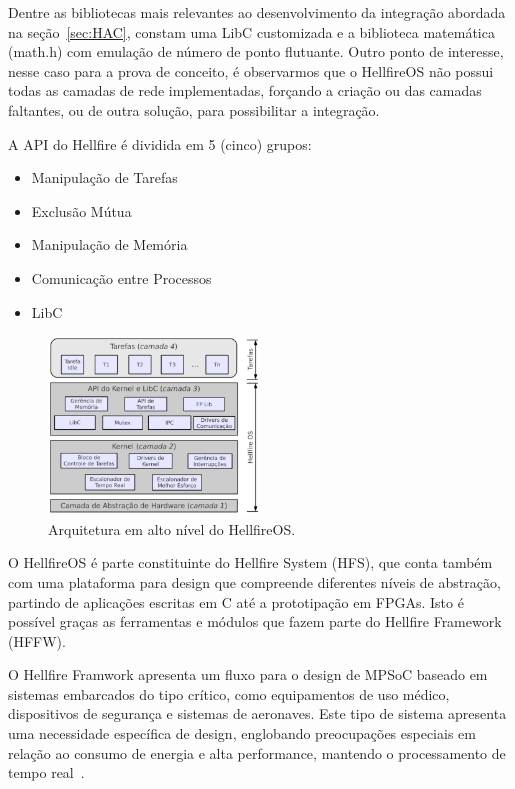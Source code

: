 Dentre as bibliotecas mais relevantes ao desenvolvimento da integração abordada na seção~\ref{sec:HAC},
constam uma LibC customizada e a biblioteca matemática (math.h) com emulação de número de ponto
flutuante. Outro ponto de interesse, nesse caso para a prova de conceito, é observarmos
que o HellfireOS não possui todas as camadas de rede implementadas, forçando a criação
ou das camadas faltantes, ou de outra solução, para possibilitar a integração.

A API do Hellfire é dividida em 5 (cinco) grupos:

\begin{itemize}
\item Manipulação de Tarefas
\item Exclusão Mútua
\item Manipulação de Memória
\item Comunicação entre Processos
\item LibC
\end{itemize}


\begin{figure}[H]
	\centering
		\includegraphics[width=0.5\textwidth]{fig/HellfireArch.png}
	\caption{Arquitetura em alto nível do HellfireOS.}
\end{figure}


O HellfireOS é parte constituinte do Hellfire System (HFS), que conta também com uma
plataforma para design que compreende diferentes níveis de abstração, partindo de aplicações
escritas em C até a prototipação em FPGAs. Isto é possível graças as ferramentas e módulos
que fazem parte do Hellfire Framework (HFFW).

O Hellfire Framwork apresenta um fluxo para o design de MPSoC baseado em sistemas embarcados do tipo crítico,
como equipamentos de uso médico, dispositivos de segurança e sistemas de aeronaves. Este tipo de sistema
apresenta uma necessidade específica de design, englobando preocupações especiais em relação ao consumo de
energia e alta performance, mantendo o processamento de tempo real~\cite{5450495}.
